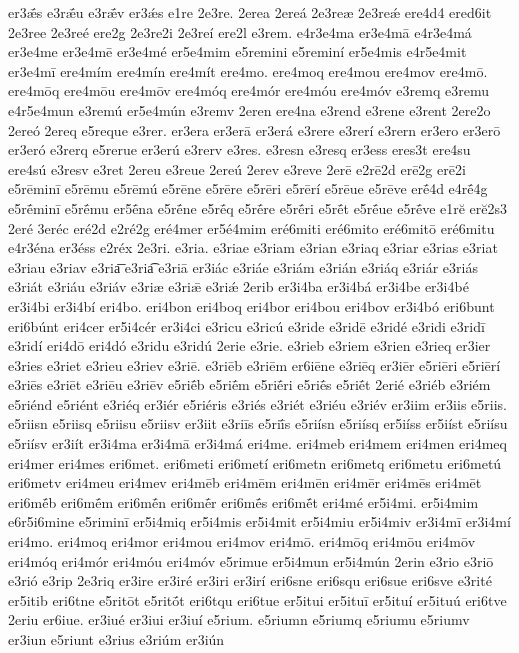 {er3ǣ́s
e3rǣ́u
e3rǣ́v
er3ǽs
e1re
2e3re.
2erea
2ereá
2e3reæ
2e3reǽ
ere4d4
ered6it
2e3ree
2e3reé
ere2g
2e3re2i
2e3reí
ere2l
e3rem.
e4r3e4ma
er3e4mā
e4r3e4má
er3e4me
er3e4mē
er3e4mé
er5e4mim
e5remini
e5reminí
er5e4mis
e4r5e4mit
er3e4mī
ere4mím
ere4mín
ere4mít
ere4mo.
ere4moq
ere4mou
ere4mov
ere4mō.
ere4mōq
ere4mōu
ere4mōv
ere4móq
ere4mór
ere4móu
ere4móv
e3remq
e3remu
e4r5e4mun
e3remú
er5e4mún
e3remv
2eren
ere4na
e3rend
e3rene
e3rent
2ere2o
2ereó
2ereq
e5reque
e3rer.
er3era
er3erā
er3erá
e3rere
e3rerí
e3rern
er3ero
er3erō
er3eró
e3rerq
e5rerue
er3erú
e3rerv
e3res.
e3resn
e3resq
er3ess
eres3t
ere4su
ere4sú
e3resv
e3ret
2ereu
e3reue
2ereú
2erev
e3reve
2erē
e2rē2d
erē2g
erē2i
e5rēminī
e5rēmu
e5rēmú
e5rēne
e5rēre
e5rēri
e5rērí
e5rēue
e5rēve
erḗ4d
e4rḗ4g
e5rḗminī
e5rḗmu
er5ḗna
e5rḗne
e5rḗq
e5rḗre
e5rḗri
e5rḗt
e5rḗue
e5rḗve
e1rĕ
erĕ2s3
2eré
3eréc
eré2d
e2ré2g
eré4mer
er5é4mim
eré6miti
eré6mito
eré6mitō
eré6mitu
e4r3éna
er3éss
e2réx
2e3ri.
e3ria.
e3riae
e3riam
e3rian
e3riaq
e3riar
e3rias
e3riat
e3riau
e3riav
e3ria͞
e3ria͡
e3riā
er3iác
e3riáe
e3riám
e3rián
e3riáq
e3riár
e3riás
e3riát
e3riáu
e3riáv
e3riæ
e3riǣ
e3riǽ
2erib
er3i4ba
er3i4bá
er3i4be
er3i4bé
er3i4bi
er3i4bí
eri4bo.
eri4bon
eri4boq
eri4bor
eri4bou
eri4bov
er3i4bó
eri6bunt
eri6búnt
eri4cer
er5i4cér
er3i4ci
e3ricu
e3ricú
e3ride
e3ridē
e3ridé
e3ridi
e3ridī
e3ridí
eri4dō
eri4dó
e3ridu
e3ridú
2erie
e3rie.
e3rieb
e3riem
e3rien
e3rieq
er3ier
e3ries
e3riet
e3rieu
e3riev
e3riē.
e3riēb
e3riēm
er6iēne
e3riēq
er3iēr
e5riēri
e5riērí
e3riēs
e3riēt
e3riēu
e3riēv
e5riḗb
e5riḗm
e5riḗri
e5riḗs
e5riḗt
2erié
e3riéb
e3riém
e5riénd
e5riént
e3riéq
er3iér
e5riéris
e3riés
e3riét
e3riéu
e3riév
er3iim
er3iis
e5riis.
e5riisn
e5riisq
e5riisu
e5riisv
er3iit
e3riīs
e5riī́s
e5riísn
e5riísq
er5iíss
er5iíst
e5riísu
e5riísv
er3iít
er3i4ma
er3i4mā
er3i4má
eri4me.
eri4meb
eri4mem
eri4men
eri4meq
eri4mer
eri4mes
eri6met.
eri6meti
eri6metí
eri6metn
eri6metq
eri6metu
eri6metú
eri6metv
eri4meu
eri4mev
eri4mēb
eri4mēm
eri4mēn
eri4mēr
eri4mēs
eri4mēt
eri6mḗb
eri6mḗm
eri6mḗn
eri6mḗr
eri6mḗs
eri6mḗt
eri4mé
er5i4mi.
er5i4mim
e6r5i6mine
e5riminī
er5i4miq
er5i4mis
er5i4mit
er5i4miu
er5i4miv
er3i4mī
er3i4mí
eri4mo.
eri4moq
eri4mor
eri4mou
eri4mov
eri4mō.
eri4mōq
eri4mōu
eri4mōv
eri4móq
eri4mór
eri4móu
eri4móv
e5rimue
er5i4mun
er5i4mún
2erin
e3rio
e3riō
e3rió
e3rip
2e3riq
er3ire
er3iré
er3iri
er3irí
eri6sne
eri6squ
eri6sue
eri6sve
e3rité
er5itib
eri6tne
e5ritōt
e5ritṓt
eri6tqu
eri6tue
er5itui
er5ituī
er5ituí
er5ituú
eri6tve
2eriu
er6iue.
er3iué
er3iui
er3iuí
e5rium.
e5riumn
e5riumq
e5riumu
e5riumv
er3iun
e5riunt
e3rius
e3riúm
er3iún
}

